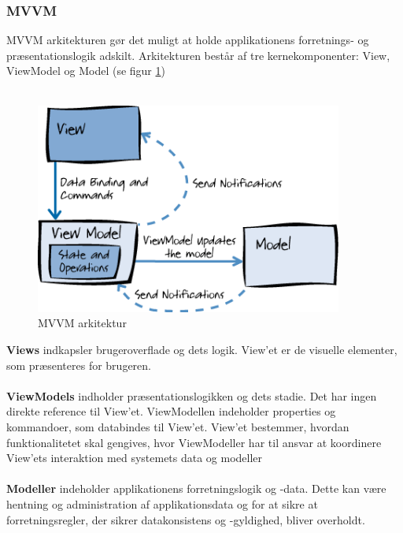 \documentclass[Rapport/Rapport_main.tex]{subfiles}
\begin{document}
\subsubsection{MVVM}
MVVM arkitekturen gør det muligt at holde applikationens forretnings- og præsentationslogik adskilt. Arkitekturen består af tre kernekomponenter: View, ViewModel og Model (se figur \ref{fig:MVVM_pic}) \\\\
\begin{figure}[H]
    \centering
    \includegraphics[width=0.90\textwidth]{Rapport/Analyse/graphics/MVVM.png}
    \caption{MVVM arkitektur\cite{MVVM}}
    \label{fig:MVVM_pic}
\end{figure}
\textbf{Views} indkapsler brugeroverflade og dets logik. View'et er de visuelle elementer, som præsenteres for brugeren. \\\\
\textbf{ViewModels} indholder præsentationslogikken og dets stadie. Det har ingen direkte reference til View'et. ViewModellen indeholder properties og kommandoer, som databindes til View'et. View'et bestemmer, hvordan funktionalitetet skal gengives, hvor ViewModeller har til ansvar at koordinere View'ets interaktion med systemets data og modeller\\\\
\textbf{Modeller} indeholder applikationens forretningslogik og -data. Dette kan være hentning og administration af applikationsdata og for at sikre at forretningsregler, der sikrer datakonsistens og -gyldighed, bliver overholdt. 
\end{document}
